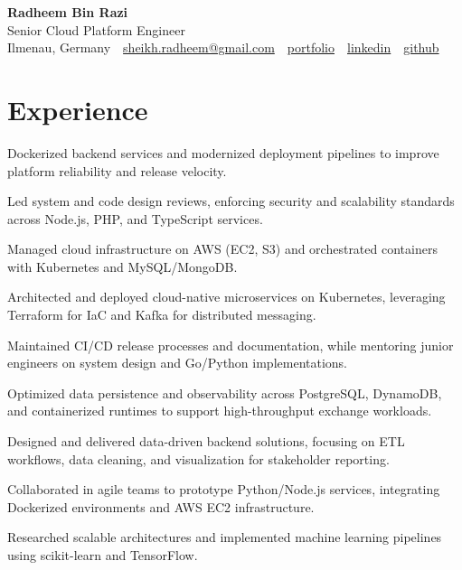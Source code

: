 \documentclass[11pt,a4paper]{resume}
\makeatletter
\newcommand{\Portfolio}{https://radheem.github.io/my-cv}
\newcommand{\PortfolioText}{portfolio}
\newcommand{\GitHub}{https://github.com/radheem}
\newcommand{\LinkedIn}{https://www.linkedin.com/in/radheem-razi}
\newcommand{\Email}{sheikh.radheem@gmail.com}
\makeatother
\begin{document}
\begin{center}
  {\huge\bfseries Radheem Bin Razi}\\[3pt]
  {\large Senior Cloud Platform Engineer}\\[6pt]
  \small
  Ilmenau, Germany \,\textbar\,
  \href{mailto:\Email}{\Email} \,\textbar\,
  \href{\Portfolio}{\PortfolioText} \,\textbar\,
  \href{\LinkedIn}{linkedin} \,\textbar\,
  \href{\GitHub}{github}
\end{center}
\vspace{2pt}

\section{Experience}

\bullets
  \item Dockerized backend services and modernized deployment pipelines to improve platform reliability and release velocity.
  \item Led system and code design reviews, enforcing security and scalability standards across Node.js, PHP, and TypeScript services.
  \item Managed cloud infrastructure on AWS (EC2, S3) and orchestrated containers with Kubernetes and MySQL/MongoDB.
\bulletsend
\vspace{3pt}
\bullets
  \item Architected and deployed cloud-native microservices on Kubernetes, leveraging Terraform for IaC and Kafka for distributed messaging.
  \item Maintained CI/CD release processes and documentation, while mentoring junior engineers on system design and Go/Python implementations.
  \item Optimized data persistence and observability across PostgreSQL, DynamoDB, and containerized runtimes to support high-throughput exchange workloads.
\bulletsend
\vspace{3pt}
\bullets
  \item Designed and delivered data-driven backend solutions, focusing on ETL workflows, data cleaning, and visualization for stakeholder reporting.
  \item Collaborated in agile teams to prototype Python/Node.js services, integrating Dockerized environments and AWS EC2 infrastructure.
  \item Researched scalable architectures and implemented machine learning pipelines using scikit-learn and TensorFlow.
\bulletsend
\vspace{3pt}
\end{document}

